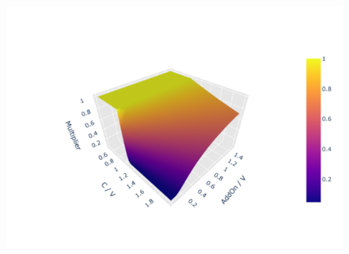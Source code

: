 \documentclass[../Thesis_AHoecherl.tex]{subfiles}
\begin{document}

% 

\begin{figure}
	\centering
	\includegraphics[scale=0.9]{Graphics/SACCR_Multiplier_Function.pdf}
	\caption{}
	\label{fig:multiplier}
\end{figure}

% 

% 



% 

% 

% 
\end{document}
